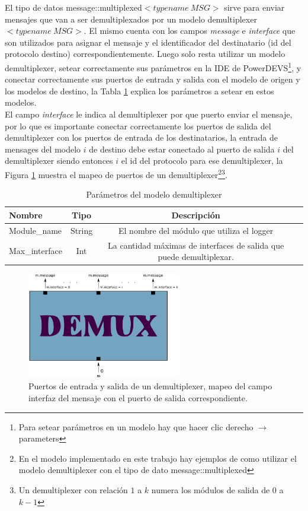 \documentclass[10pt,a4paper]{article}
\begin{document}
El tipo de datos message::multiplexed$<typename\ MSG>$ sirve para enviar mensajes que van a ser demultiplexados por un modelo demultiplexer$<typename\ MSG>$. El mismo cuenta con los campos \textit{message} e \textit{interface} que son utilizados para asignar el mensaje y el identificador del destinatario (id del protocolo destino) correspondientemente. Luego solo resta utilizar un modelo demultiplexer, setear correctamente sus parámetros en la IDE de PowerDEVS\footnote{Para setear parámetros en un modelo hay que hacer clic derecho $\rightarrow$ parameters}, y conectar correctamente sus puertos de entrada y salida con el modelo de origen y los modelos de destino, la Tabla \ref{table: parameter demultiplexer} explica los parámetros a setear en estos modelos. \\

El campo \textit{interface} le indica al demultiplexer por que puerto enviar el mensaje, por lo que es importante conectar correctamente los puertos de salida del demultiplexer con los puertos de entrada de los destinatarios, la entrada de mensages del modelo $i$ de destino debe estar conectado al puerto de salida $i$ del demultiplexer siendo entonces $i$ el id del protocolo para ese demultiplexer, la Figura \ref{figure: demultiplexer} muestra el mapeo de puertos de un demultiplexer\footnote{En el modelo implementado en este trabajo hay ejemplos de como utilizar el modelo demultiplexer con el tipo de dato message::multiplexed}\footnote{Un demultiplexer con relación $1$ a $k$ numera los módulos de salida de $0$ a $k-1$}. \\

\begin{table}[!hbt]
	\begin{tabular}{|l|c|c|c|}
  		\hline
  		\textbf{Nombre} & \textbf{Tipo} & \textbf{Descripción} \\
  		\hline
  		Module\_name & String & El nombre del módulo que utiliza el logger \\
  		\hline
  		Max\_interface & Int & La cantidad máximas de interfaces de salida que puede demultiplexar. \\
  		\hline
	\end{tabular}
	\caption{Parámetros del modelo demultiplexer}
	\label{table: parameter demultiplexer}
\end{table}

\begin{figure}[!hbt]
    \centering
    \includegraphics[width = 0.6\textwidth]{img/png/demultiplexer.png}
    \caption{Puertos de entrada y salida de un demultiplexer, mapeo del campo interfaz del mensaje con el puerto de salida correspondiente.}
    \label{figure: demultiplexer}
\end{figure}
\end{document}
